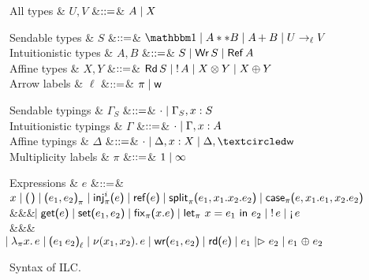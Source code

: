 \begin{figure*}[t]
  \centering
    \begin{grammar}  
        All types
      & $U, V$
        &$\mathrel{::=}$& $A \mathrel{\mid} X$
    \end{grammar}          
  \begin{minipage}{.475\textwidth}
    \centering
    \begin{grammar}
      Sendable types
      & $S$
      &$\mathrel{::=}$& $\tyUnit \bnfalt A ** B \bnfalt \tySum{A}{}{B} \bnfalt \tyArr{U}{\ell}{V}$
      \\
      Intuitionistic types
      & $A,B$
      &$\mathrel{::=}$& $S \mathrel{\mid} \text{\textsf{Wr}}\,S \mathrel{\mid} \text{\textsf{Ref}}\,A$
      \\
      Affine types
      & $X,Y$
      &$\mathrel{::=}$& $\text{\textsf{Rd}}\,S \mathrel{\mid} {!}\,{A} \mathrel{\mid}
      {X}\otimes{Y} \mathrel{\mid} {X}\oplus{Y}$
      \\
      Arrow labels
      & $\ell$
      &$\mathrel{::=}$& $\pi \mathrel{\mid} \textsf{w}$
    \end{grammar}
  \end{minipage}%
  \begin{minipage}{.475\textwidth}
    \centering
    \begin{grammar}
      Sendable typings
      & ${\Gamma}_S$
      &$\mathrel{::=}$& $\cdot \mathrel{\mid} {\Gamma}_S,x:S$
      \\
      Intuitionistic typings
      & $\Gamma$
      &$\mathrel{::=}$& $\cdot \mathrel{\mid} \Gamma,x:A$
      \\
      Affine typings
      & $\Delta$
      &$\mathrel{::=}$& $\emptyctxt \bnfalt \Delta,x:X \bnfalt \Delta, \wrtok$
      \\            
      Multiplicity labels
      & $\pi$
      &$\mathrel{::=}$& $1 \mathrel{\mid} \infty$
    \end{grammar}
  \end{minipage}
  \begin{grammar}
    Expressions
    & $e$
    &$\mathrel{::=}$&
    $\eVar{x} \bnfalt \eUnit \bnfalt \ePair{e_1}{e_2}{\pi} \bnfalt \eInj{i}{e}
    \bnfalt \eRef{e} \bnfalt \eSplit{e_1}{x_1}{x_2}{e_2} \bnfalt
    \eCase{\pi}{e}{x_1}{e_1}{x_2}{e_2}$
    \\ &&& $\hspace{-1.02ex}\mathrel{\mid} \text{\textsf{get}}\textsf{(}{e}\textsf{)} \mathrel{\mid} \text{\textsf{set}}\textsf{(}{e_1},{e_2}\textsf{)} \mathrel{\mid} \text{\textsf{fix}}_{\pi}\textsf{(}{x}.{e}\textsf{)}
    \mathrel{\mid} \text{\textsf{let}}_{\pi}\ {x} = {e_1}\ \text{\textsf{in}}\ {e_2} \mathrel{\mid} {!}\,{e} \mathrel{\mid} \textnormal{!`}\,{e}$
    \\ &&& $\hspace{-1.02ex}\mathrel{\mid} \lambda_{\pi} {x}.\,{e} \mathrel{\mid} \textsf{(} e_1\,e_2\textsf{)}_{\ell}
    \mathrel{\mid} \nu(x_1,x_2).\,e \mathrel{\mid} \text{\textsf{wr}}\textsf{(}{e_1},{e_2}\textsf{)}
    \mathrel{\mid} \text{\textsf{rd}}\textsf{(}{e}\textsf{)} \mathrel{\mid} e_1 \mathrel{|\rhd} e_2 \mathrel{\mid} e_1 \mathrel{\oplus} e_2$
  \end{grammar}      
  \caption{Syntax of ILC.}
  \label{fig:ilc-syntax}
\end{figure*}
